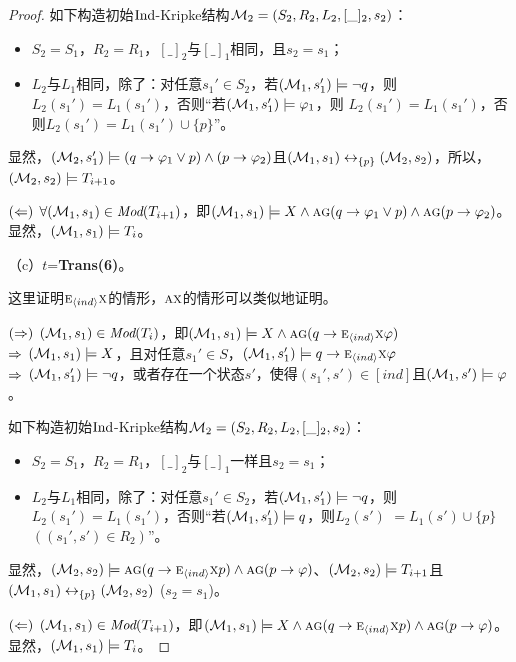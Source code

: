 \begin{proof}
	如下构造初始$\textrm{Ind}$-Kripke结构${\cal M}_2=(S_2,R_2,L_2,[\_]_2,s_2)$：
	\begin{itemize}
		\item $S_2=S_1$，$R_2=R_1$，$[\_]_2$与$[\_]_1$相同，且$s_2=s_1$；
		\item $L_2$与$L_1$相同，除了：对任意$s_1'\in S_2$，若$({\cal M}_1, s_1') \models \neg q$，则$L_2(s_1') = L_1(s_1')$，否则“若$({\cal M}_1,s_1') \models \varphi_1$，则 $L_2(s_1')=L_1(s_1')$，否则$L_2(s_1')=L_1(s_1') \cup \{p\}$”。
	\end{itemize}
	显然，$({\cal M}_2,s_1') \models (q\rightarrow \varphi_1 \vee p) \wedge (p \rightarrow \varphi_2)$且$({\cal M}_1, s_1) \leftrightarrow_{\{p\}} ({\cal M}_2, s_2)$，所以，$({\cal M}_2,s_2) \models T_{i+1}$。
	
	$(\Leftarrow)$  $\forall ({\cal M}_1, s_1) \in \textit{Mod}(T_{i+1})$，即$({\cal M}_1,s_1) \models X \wedge \textsc{a}\textsc{g} (q\rightarrow \varphi_1 \vee p) \wedge \textsc{a}\textsc{g}(p \rightarrow \varphi_2)$。 显然，$({\cal M}_1, s_1) \models T_i$。
	
	（c）$t$=\textbf{Trans(6)}。
	
	这里证明$\textsc{e}_{{\langle{ind}\rangle}} \textsc{x}$的情形，$\textsc{a} \textsc{x}$的情形可以类似地证明。
	
	$(\Rightarrow)$ $({\cal M}_1,s_1) \in \textit{Mod}(T_i)$，即$({\cal M}_1,s_1) \models X \wedge \textsc{a}\textsc{g}(q \rightarrow \textsc{e}_{{\langle{ind}\rangle}}\textsc{x} \varphi)$\\
	$\Rightarrow$ $({\cal M}_1,s_1) \models X$，且对任意$s_1'\in S$，$({\cal M}_1,s_1') \models q \rightarrow \textsc{e}_{{\langle{ind}\rangle}} \textsc{x} \varphi$\\
	$\Rightarrow$ $({\cal M}_1,s_1') \models \neg q$，或者存在一个状态$s'$，使得$(s_1', s') \in [ind]$且$({\cal M}_1,s') \models \varphi$。
	
	如下构造初始$\textrm{Ind}$-Kripke结构${\cal M}_2=(S_2,R_2,L_2,[\_]_2,s_2)$：
	\begin{itemize}
		\item $S_2=S_1$，$R_2=R_1$，$[\_]_2$与$[\_]_1$一样且$s_2=s_1$；
		\item $L_2$与$L_1$相同，除了：对任意$s_1'\in S_2$，若$({\cal M}_1, s_1') \models \neg q$，则$L_2(s_1') = L_1(s_1')$，否则“若$({\cal M}_1,s_1') \models q$，则$L_2(s')$ $=L_1(s')\cup \{p\}$ $((s_1',s')\in R_2)$”。
	\end{itemize}
	显然，$({\cal M}_2,s_2) \models \textsc{a}\textsc{g}(q\rightarrow \textsc{e}_{{\langle{ind}\rangle}} \textsc{x} p) \wedge \textsc{a}\textsc{g}(p \rightarrow \varphi)$、$({\cal M}_2,s_2) \models T_{i+1}$且$({\cal M}_1, s_1) \leftrightarrow_{\{p\}} ({\cal M}_2, s_2)$ ($s_2=s_1$)。
	
	$(\Leftarrow)$ $({\cal M}_1, s_1) \in \textit{Mod}(T_{i+1})$，即$({\cal M}_1,s_1) \models X \wedge \textsc{a}\textsc{g}(q\rightarrow \textsc{e}_{{\langle{ind}\rangle}} \textsc{x} p) \wedge \textsc{a}\textsc{g}(p \rightarrow \varphi)$。显然，$({\cal M}_1, s_1) \models T_i$。
\end{proof}

